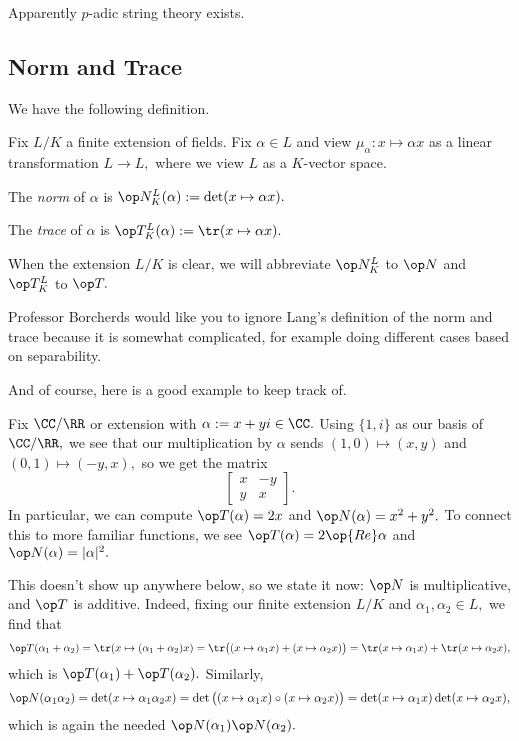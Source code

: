 \documentclass[../notes.tex]{subfiles}
\begin{document}
\begin{remark}
	Apparently $p$-adic string theory exists.
\end{remark}

\subsection{Norm and Trace}
We have the following definition.
\begin{definition}
	Fix $L/K$ a finite extension of fields. Fix $\alpha\in L$ and view $\mu_\alpha:x\mapsto \alpha x$ as a linear transformation $L\to L,$ where we view $L$ as a $K$-vector space.
	\begin{listalph}
		\item The \textit{norm} of $\alpha$ is $\op N^L_K(\alpha):=\det(x\mapsto \alpha x).$ 
		\item The \textit{trace} of $\alpha$ is $\op T^L_K(\alpha):=\tr (x\mapsto \alpha x).$
	\end{listalph}
	When the extension $L/K$ is clear, we will abbreviate $\op N^L_K$ to $\op N$ and $\op T^L_K$ to $\op T.$
\end{definition}
\begin{warn}
	Professor Borcherds would like you to ignore Lang's definition of the norm and trace because it is somewhat complicated, for example doing different cases based on separability.
\end{warn}
And of course, here is a good example to keep track of.
\begin{ex}
	Fix $\CC/\RR$ or extension with $\alpha:=x+yi\in\CC.$ Using $\{1,i\}$ as our basis of $\CC/\RR,$ we see that our multiplication by $\alpha$ sends $(1,0)\mapsto(x,y)$ and $(0,1)\mapsto(-y,x),$ so we get the matrix
	\[\begin{bmatrix}
		x & -y \\
		y & x
	\end{bmatrix}.\]
	In particular, we can compute $\op T(\alpha)=2x$ and $\op N(\alpha)=x^2+y^2.$ To connect this to more familiar functions, we see $\op T(\alpha)=2\op{Re}\alpha$ and $\op N(\alpha)=|\alpha|^2.$
\end{ex}
\begin{remark}[Nir]
	This doesn't show up anywhere below, so we state it now: $\op N$ is multiplicative, and $\op T$ is additive. Indeed, fixing our finite extension $L/K$ and $\alpha_1,\alpha_2\in L,$ we find that
	\[\op T(\alpha_1+\alpha_2)=\tr(x\mapsto(\alpha_1+\alpha_2)x)=\tr\big((x\mapsto\alpha_1x)+(x\mapsto\alpha_2x)\big)=\tr(x\mapsto\alpha_1x)+\tr(x\mapsto\alpha_2x),\]
	which is $\op T(\alpha_1)+\op T(\alpha_2).$ Similarly,
	\[\op N(\alpha_1\alpha_2)=\det(x\mapsto\alpha_1\alpha_2x)=\det\big((x\mapsto\alpha_1x)\circ(x\mapsto\alpha_2x)\big)=\det(x\mapsto\alpha_1x)\det(x\mapsto\alpha_2x),\]
	which is again the needed $\op N(\alpha_1)\op N(\alpha_2).$
\end{remark}
\end{document}
